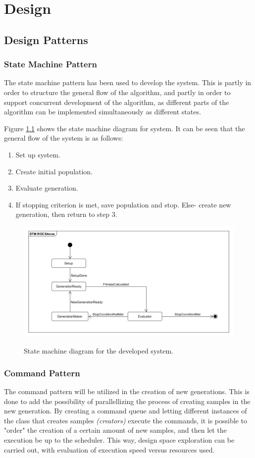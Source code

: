 
\chapter{Design}
\section{Design Patterns}
\subsection{State Machine Pattern}
The state machine pattern has been used to develop the system. This is partly in order to structure the general flow of the algorithm, and partly in order to support concurrent development of the algorithm, as different parts of the algorithm can be implemented simultaneously as different states.

Figure \ref{fig:STM_diagram} shows the state machine diagram for system. It can be seen that the general flow of the system is as follows:
\begin{enumerate}
	\item Set up system.
	\item Create initial population.
	\item Evaluate generation.
	\item If stopping criterion is met, save population and stop. Else-  create new generation, then return to step 3.
\end{enumerate}

\begin{figure}[H]
	\centering
	{\includegraphics[width=\textwidth]{Images/STM_ROGSAnne.PNG}}\\[0.5cm]
	\caption{State machine diagram for the developed system.}
	\label{fig:STM_diagram}
\end{figure}

\subsection{Command Pattern}
The command pattern will be utilized in the creation of new generations. This is done to add the possibility of parallellizing the process of creating samples in the new generation. By creating a command queue and letting different instances of the class that creates samples \textit{(creators)} execute the commands, it is possible to "order" the creation of a certain amount of new samples, and then let the execution be up to the scheduler. This way, design space exploration can be carried out, with evaluation of execution speed versus resources used.